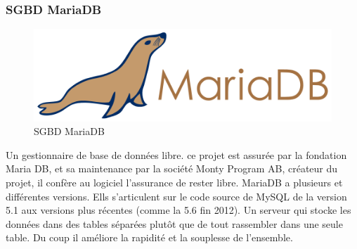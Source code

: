\subsubsection{SGBD MariaDB}

\begin{figure}[h]
	\includegraphics[scale=0.5]{./Template LaTeX/Images/logo-mariadb-500px.png}
	\centering
	\caption{SGBD MariaDB}
\end{figure}
Un gestionnaire de base de données libre.
ce projet est assurée par la fondation Maria DB, et sa
maintenance par la société Monty Program AB, créateur du
projet, il confère au logiciel l'assurance de rester libre. MariaDB a
plusieurs et différentes versions. Ells s'articulent sur le code
source de MySQL de la version 5.1 aux versions plus récentes
(comme la 5.6 fin 2012). Un serveur qui stocke les données dans
des tables séparées plutôt que de tout rassembler dans une seule
table. Du coup il améliore la rapidité et la souplesse de
l'ensemble.

